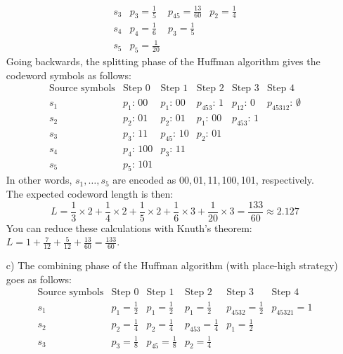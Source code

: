 \documentclass[11pt]{article}
\begin{document}
\begin{itemize}
\[\begin{array}{clllll}
         s_3          & p_3 = \frac{1}{5} & p_{45} = \frac{13}{60} & p_2     = \frac{1}{4}\\[1mm]
         s_4          & p_4 = \frac{1}{6} & p_3    = \frac{1}{5}\\[1mm]
         s_5          & p_5 = \frac{1}{20}
     \end{array}\]
     Going backwards, the splitting phase of the Huffman algorithm gives the codeword symbols as follows:
     \[\begin{array}{clllll}
 \text{Source symbols}& \text{Step 0} & \text{Step 1} & \text{Step 2} & \text{Step 3} & \text{Step 4}\\[1mm]
         s_1          & p_1:\,    00  & p_1:\,     00 & p_{453}:\, 1  & p_{12} :\,0   & p_{45312}:\,\emptyset\\[1mm]
         s_2          & p_2:\,    01  & p_2:\,     01 & p_1:\,    00  & p_{453}:\,1\\[1mm]
         s_3          & p_3:\,    11  & p_{45}:\,  10 & p_2:\,    01\\[1mm]
         s_4          & p_4:\,   100  & p_3:\,     11\\[1mm]
         s_5          & p_5:\,   101
     \end{array}\]
     In other words, $s_1,\ldots,s_5$ are encoded as 00,\,01,\,11,\,100,\,101, respectively.\\
     The expected codeword length is then:
     \[
       L = \frac{1}{3}\times 2 + \frac{1}{4}\times 2 + \frac{1}{5}\times 2 + \frac{1}{6}\times 3 + \frac{1}{20}\times 3
         = \frac{133}{60}
         \approx 2.127
     \]
     You can reduce these calculations with Knuth's theorem: $L = 1 + \frac{7}{12} + \frac{5}{12} + \frac{13}{60} = \frac{133}{60}$.
  \item[{c)}] The combining phase of the Huffman algorithm (with place-high strategy) goes as follows:
     \[\begin{array}{clllll}
 \text{Source symbols}& \text{Step 0}      & \text{Step 1}        & \text{Step 2}         & \text{Step 3}          & \text{Step 4}\\[1mm]
         s_1          & p_1 = \frac{1}{2}  & p_1    = \frac{1}{2} & p_1     = \frac{1}{2} & p_{4532} = \frac{1}{2} & p_{45321} = 1\\[1mm]
         s_2          & p_2 = \frac{1}{4}  & p_2    = \frac{1}{4} & p_{453} = \frac{1}{4} & p_1      = \frac{1}{2}\\[1mm]
         s_3          & p_3 = \frac{1}{8}  & p_{45} = \frac{1}{8} & p_2     = \frac{1}{4}\\[1mm]

\end{array}\]
\end{itemize}
\end{document}
